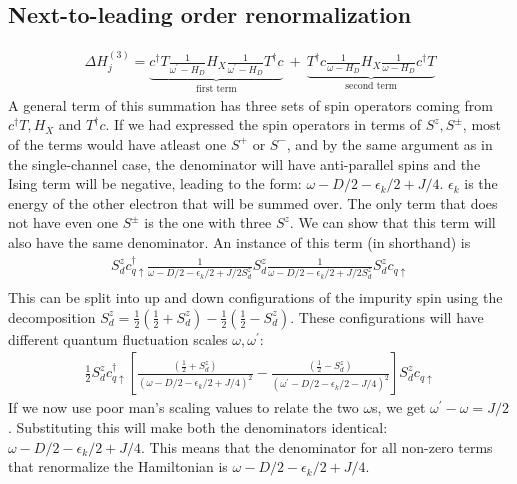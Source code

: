 \subsection{Next-to-leading order renormalization}
\begin{equation}\begin{aligned}
	\Delta H^{(3)}_j = \underbrace{c^\dagger T \frac{1}{\omega^\prime - H_D} H_X \frac{1}{\omega^\prime - H_D} T^\dagger c}_\text{first term} ~+~ \underbrace{T^\dagger c \frac{1}{\omega - H_D} H_X \frac{1}{\omega - H_D} c^\dagger T}_\text{second term}
\end{aligned}\end{equation}
A general term of this summation has three sets of spin operators coming from \(c^\dagger T, H_X\) and \(T^\dagger c\). If we had expressed the spin operators in terms of \(S^z, S^\pm\), most of the terms would have atleast one \(S^+\) or \(S^-\), and by the same argument as in the single-channel case, the denominator will have anti-parallel spins and the Ising term will be negative, leading to the form: \(\omega - D/2 - \epsilon_k/2 + J/4\). \(\epsilon_k\) is the energy of the other electron that will be summed over. The only term that does not have even one \(S^\pm\) is the one with three \(S^z\). We can show that this term will also have the same denominator. An instance of this term (in shorthand) is
\begin{equation}\begin{aligned}
	S_d^z c^\dagger_{q \uparrow} \frac{1}{\omega - D/2 -\epsilon_k/2 + J/2 S_d^z} S_d^z \frac{1}{\omega - D/2 -\epsilon_k/2 + J/2 S_d^z} S_d^z c_{q \uparrow}\\
\end{aligned}\end{equation}
This can be split into up and down configurations of the impurity spin using the decomposition \(S_d^z = \frac{1}{2}\left(\frac{1}{2} + S_d^z\right) - \frac{1}{2}\left(\frac{1}{2} - S_d^z \right) \). These configurations will have different quantum fluctuation scales \(\omega, \omega^\prime\):
\begin{equation}\begin{aligned}
	\frac{1}{2}S_d^z c^\dagger_{q \uparrow}\left[\frac{\left(\frac{1}{2} + S_d^z\right)}{\left(\omega - D/2 -\epsilon_k/2 + J/4\right)^2} - \frac{\left(\frac{1}{2} - S_d^z\right)}{\left(\omega^\prime - D/2 -\epsilon_k/2 - J/4\right)^2}\right]S_d^z c_{q \uparrow}
\end{aligned}\end{equation}
If we now use poor man's scaling values to relate the two \(\omega\)s, we get \(\omega^\prime - \omega = J/2\). Substituting this will make both the denominators identical: \(\omega - D/2 -\epsilon_k/2 + J/4\). This means that the denominator for all non-zero terms that renormalize the Hamiltonian is \(\omega - D/2 - \epsilon_k/2 + J/4\).

